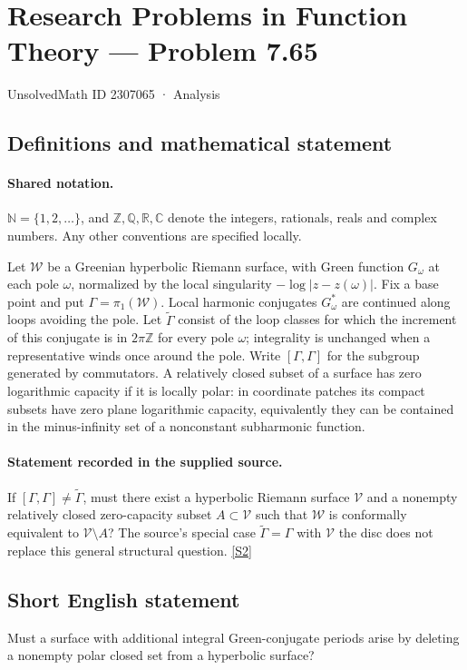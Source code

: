 \documentclass[11pt]{article}
\newcommand{\sref}[2]{\hyperlink{source:#1:#2}{[S#2]}}
\begin{document}
\setcounter{section}{2307064}
\section{Research Problems in Function Theory — Problem 7.65}\label{2307065}
{\small\sffamily UnsolvedMath ID 2307065 · Analysis}
\subsection{Definitions and mathematical statement}

\paragraph{Shared notation.}$\mathbb N=\{1,2,\ldots\}$, and $\mathbb Z,\mathbb Q,\mathbb R,\mathbb C$ denote the integers, rationals, reals and complex numbers. Any other conventions are specified locally.


Let $\mathcal W$ be a Greenian hyperbolic Riemann surface, with Green function $G_\omega$ at each pole $\omega$, normalized by the local singularity $-\log|z-z(\omega)|$. Fix a base point and put $\Gamma=\pi_1(\mathcal W)$. Local harmonic conjugates $G_\omega^*$ are continued along loops avoiding the pole. Let $\widetilde\Gamma$ consist of the loop classes for which the increment of this conjugate is in $2\pi\mathbb Z$ for every pole $\omega$; integrality is unchanged when a representative winds once around the pole. Write $[\Gamma,\Gamma]$ for the subgroup generated by commutators. A relatively closed subset of a surface has zero logarithmic capacity if it is locally polar: in coordinate patches its compact subsets have zero plane logarithmic capacity, equivalently they can be contained in the minus-infinity set of a nonconstant subharmonic function.
\paragraph{Statement recorded in the supplied source.}
If $[\Gamma,\Gamma]\ne\widetilde\Gamma$, must there exist a hyperbolic Riemann surface $\mathcal V$ and a nonempty relatively closed zero-capacity subset $A\subset\mathcal V$ such that $\mathcal W$ is conformally equivalent to $\mathcal V\setminus A$? The source's special case $\widetilde\Gamma=\Gamma$ with $\mathcal V$ the disc does not replace this general structural question. \sref{2307065}{2}
\subsection{Short English statement}
Must a surface with additional integral Green-conjugate periods arise by deleting a nonempty polar closed set from a hyperbolic surface?
\end{document}
